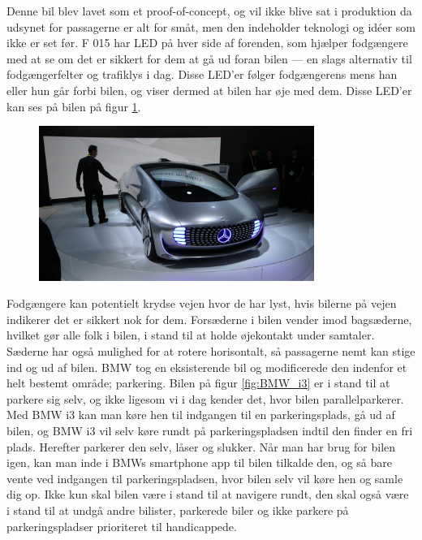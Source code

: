 Denne bil blev lavet som et proof-of-concept, og vil ikke blive sat i produktion da udsynet for passagerne er alt for småt, men den indeholder teknologi og idéer som ikke er set før. F 015 har LED på hver side af forenden, som hjælper fodgængere med at se om det er sikkert for dem at gå ud foran bilen --- en slags alternativ til fodgængerfelter og trafiklys i dag. Disse LED'er følger fodgængerens mens han eller hun går forbi bilen, og viser dermed at bilen har øje med dem. Disse LED'er kan ses på bilen på figur \ref{fig:Mercedes-Benz_F_015}.
\begin{figure}[h!]
	\centering
	\includegraphics[width=0.8\textwidth]{images/150106_0422_ces.jpg}{}
	\label{fig:Mercedes-Benz_F_015}
\end{figure}
\FloatBarrier
Fodgængere kan potentielt krydse vejen hvor de har lyst, hvis bilerne på vejen indikerer det er sikkert nok for dem. Forsæderne i bilen vender imod bagsæderne, hvilket gør alle folk i bilen, i stand til at holde øjekontakt under samtaler. Sæderne har også mulighed for at rotere horisontalt, så passagerne nemt kan stige ind og ud af bilen.
BMW tog en eksisterende bil og modificerede den indenfor et helt bestemt område; parkering. Bilen på figur \ref{fig:BMW_i3} er i stand til at parkere sig selv, og ikke ligesom vi i dag kender det, hvor bilen parallelparkerer. Med BMW i3 kan man køre hen til indgangen til en parkeringsplads, gå ud af bilen, og BMW i3 vil selv køre rundt på parkeringspladsen indtil den finder en fri plads. Herefter parkerer den selv, låser og slukker. Når man har brug for bilen igen, kan man inde i BMWs smartphone app til bilen tilkalde den, og så bare vente ved indgangen til parkeringspladsen, hvor bilen selv vil køre hen og samle dig op. Ikke kun skal bilen være i stand til at navigere rundt, den skal også være i stand til at undgå andre bilister, parkerede biler og ikke parkere på parkeringspladser prioriteret til handicappede.
